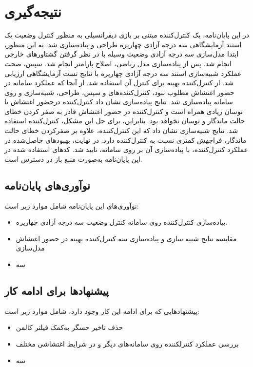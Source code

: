 \chapter{نتیجه‌گیری}
در این پایان‌نامه، یک کنترل‌کننده مبتنی بر بازی دیفرانسیلی به منظور کنترل وضعیت یک استند آزمایشگاهی سه درجه آزادی چهارپره طراحی و پیاده‌سازی شد. 
به این منظور، ابتدا مدل‌سازی سه درجه آزادی وضعیت وسیله با در نظر گرفتن گشتاورهای خارجی انجام شد. پس از پیاده‌سازی مدل ریاضی، اصلاح پارامتر انجام شد. سپس، صحت عملکرد شبیه‌سازی استند سه درجه آزادی چهارپره با نتایج تست آزمایشگاهی ارزیابی شد.
	 از کنترل‌کننده بهینه  برای کنترل آن استفاده شد. از آنجا که عملكرد سامانه در حضور اغتشاش مطلوب نبود، کنترل‌کننده‌های  و سپس،  طراحی، شبیه‌سازی  و روی سامانه پیاده‌سازی شد. نتایج پیاده‌سازی نشان داد کنترل‌کننده  درحضور اغتشاش با نوسان زیادی همراه است و کنترل‌کننده  در حضور اغتشاش قادر به صفر کردن خطای حالت ماندگار و نوسان نخواهد بود. بنابراین، برای حل این مشكل، کنترل‌کننده  استفاده شد. نتایج شبیه‌سازی نشان داد که این کنترل‌کننده، علاوه بر صفرکردن خطای حالت ماندگار، فراجهش کمتری نسبت به کنترل‌کننده  دارد. در نهایت، بهبودهای حاصل‌شده در عملكرد کنترل‌کننده، با پیاده‌سازی آن بر روی سامانه، تایید شد.
	 کدهای استفاده شده در این پایان‌نامه به‌صورت منبع باز 
	 در دسترس است.
\newpage



 \section{نوآوری‌های پایان‌نامه}
 نوآوری‌های این پایان‌نامه شامل موارد زیر است:
 \begin{itemize}
 	\item پیاده‌سازی کنترل‌کننده  روی سامانه کنترل وضعیت سه درجه آزادی چهارپره.
 	\item مقایسه نتایج شبیه سازی و پیاده‌سازی سه کنترل‌کننده بهینه در حضور اغتشاش مدل‌سازی
 	\item سه
 \end{itemize}

\section{پیشنهادها برای ادامه کار}
پیشنهادهایی که برای ادامه این کار وجود دارد، شامل موارد زیر است:
 \begin{itemize}
	\item حذف تاخیر حسگر به‌کمک فیلتر کالمن
	\item بررسی عملكرد کنترلکننده  روی سامانه‌های دیگر و در شرایط اغتشاشی مختلف
	\item سه
\end{itemize}